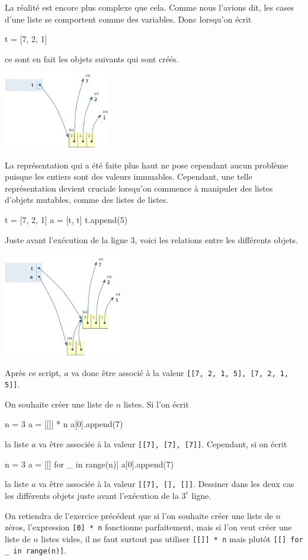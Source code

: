 \documentclass{magnolia}
\begin{document}
La réalité est encore plus complexe que cela. Comme nous l'avions dit, les cases d'une liste se
comportent comme des variables. Donc lorsqu'on écrit
\begin{pythoncode}
t = [7, 2, 1]
\end{pythoncode}
\noindent ce sont en fait les objets suivants qui sont créés.
\begin{center}
\includegraphics[width=0.35\textwidth]{../../Commun/Images/python-cours-tutor-10}
\end{center}
La représentation qui a été faite plus haut ne pose cependant aucun problème puisque les entiers sont
des valeurs immuables. Cependant, une telle représentation devient cruciale lorsqu'on commence à manipuler
des listes d'objets mutables, comme des listes de listes.
\begin{pythoncode}
t = [7, 2, 1]
a = [t, t]
t.append(5)
\end{pythoncode}
\noindent Juste avant l'exécution de la ligne 3, voici les relations entre les différents objets.
\begin{center}
\includegraphics[width=0.39\textwidth]{../../Commun/Images/python-cours-tutor-12}
\end{center}
Après ce script, $a$ va donc être associé à la valeur \verb![[7, 2, 1, 5], [7, 2, 1, 5]]!.
\vspace{2ex}
\begin{exoUnique}
\exo On souhaite créer une liste de $n$ listes. Si l'on écrit
\begin{pythoncode}
n = 3
a = [[]] * n
a[0].append(7)
\end{pythoncode}
  la liste $a$ va être associée à la valeur \verb![[7], [7], [7]]!. Cependant, si on écrit
\begin{pythoncode}
n = 3
a = [[] for _ in range(n)]
a[0].append(7)
\end{pythoncode}
la liste $a$ va être associée à la valeur \verb![[7], [], []]!. Dessiner dans les deux cas les différents objets
juste avant l'exécution de la $3^e$ ligne.
\end{exoUnique}
\vspace{2ex}
On retiendra de l'exercice précédent que si l'on souhaite créer une liste de $n$ zéros, l'expression
\verb![0] * n! fonctionne parfaitement, mais si l'on veut créer une liste de $n$ listes vides, il ne
faut surtout pas utiliser \verb![[]] * n! mais plutôt \verb![[] for _ in range(n)]!.\\
\end{document}
